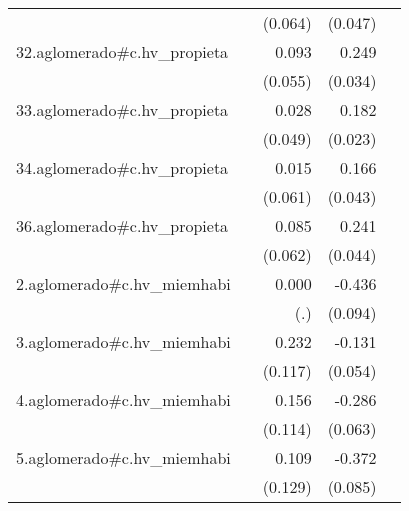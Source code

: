 {\begin{longtable}{l*{4}{D{.}{.}{-1}}}
            &                     &     (0.064)         &     (0.047)         &                     \\
\addlinespace
32.aglomerado#c.hv\_propieta&                     &       0.093         &       0.249\sym{***}&                     \\
            &                     &     (0.055)         &     (0.034)         &                     \\
\addlinespace
33.aglomerado#c.hv\_propieta&                     &       0.028         &       0.182\sym{***}&                     \\
            &                     &     (0.049)         &     (0.023)         &                     \\
\addlinespace
34.aglomerado#c.hv\_propieta&                     &       0.015         &       0.166\sym{***}&                     \\
            &                     &     (0.061)         &     (0.043)         &                     \\
\addlinespace
36.aglomerado#c.hv\_propieta&                     &       0.085         &       0.241\sym{***}&                     \\
            &                     &     (0.062)         &     (0.044)         &                     \\
\addlinespace
2.aglomerado#c.hv\_miemhabi&                     &       0.000         &      -0.436\sym{***}&                     \\
            &                     &         (.)         &     (0.094)         &                     \\
\addlinespace
3.aglomerado#c.hv\_miemhabi&                     &       0.232\sym{*}  &      -0.131\sym{*}  &                     \\
            &                     &     (0.117)         &     (0.054)         &                     \\
\addlinespace
4.aglomerado#c.hv\_miemhabi&                     &       0.156         &      -0.286\sym{***}&                     \\
            &                     &     (0.114)         &     (0.063)         &                     \\
\addlinespace
5.aglomerado#c.hv\_miemhabi&                     &       0.109         &      -0.372\sym{***}&                     \\
            &                     &     (0.129)         &     (0.085)         &                     \\

\end{longtable}}
